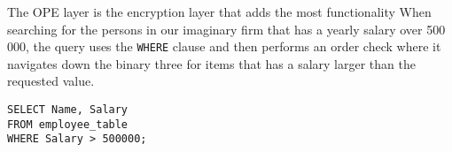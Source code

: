 %
%


The OPE layer is the encryption layer that adds the most functionality
When searching for the persons in our imaginary firm that has a yearly salary over 500 000, the query uses the \verb!WHERE! clause and then performs an order check where it navigates down the binary three for items that has a salary larger than the requested value.

\begin{verbatim}
SELECT Name, Salary
FROM employee_table
WHERE Salary > 500000;
\end{verbatim}


